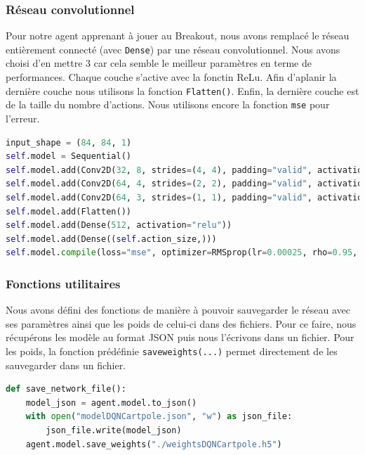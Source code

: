 \documentclass[10pt,a4paper]{article}
\begin{document}
\subsubsection{Réseau convolutionnel}

Pour notre agent apprenant à jouer au Breakout, nous avons remplacé le réseau entièrement connecté (avec \lstinline{Dense}) par une réseau convolutionnel. Nous avons choisi d'en mettre 3 car cela semble le meilleur paramètres en terme de performances. Chaque couche s'active avec la fonctin ReLu. Afin d'aplanir la dernière couche nous utilisons la fonction \lstinline{Flatten()}. Enfin, la dernière couche est de la taille du nombre d'actions. Nous utilisons encore la fonction \lstinline{mse} pour l'erreur.

\begin{lstlisting}[language=Python, caption=Réseau convolutionnel de l'agent Breakout]
input_shape = (84, 84, 1)
self.model = Sequential()
self.model.add(Conv2D(32, 8, strides=(4, 4), padding="valid", activation="relu", input_shape=input_shape, data_format="channels_first"))
self.model.add(Conv2D(64, 4, strides=(2, 2), padding="valid", activation="relu", input_shape=input_shape, data_format="channels_first"))
self.model.add(Conv2D(64, 3, strides=(1, 1), padding="valid", activation="relu", input_shape=input_shape, data_format="channels_first"))
self.model.add(Flatten())
self.model.add(Dense(512, activation="relu"))
self.model.add(Dense((self.action_size,)))
self.model.compile(loss="mse", optimizer=RMSprop(lr=0.00025, rho=0.95, epsilon=0.01), metrics=["accuracy"])
\end{lstlisting}

\subsubsection{Fonctions utilitaires}

Nous avons défini des fonctions de manière à pouvoir sauvegarder le réseau avec ses paramètres ainsi que les poids de celui-ci dans des fichiers. Pour ce faire, nous récupérons les modèle au format JSON puis nous l'écrivons dans un fichier. Pour les poids, la fonction prédéfinie \lstinline{saveweights(...)} permet directement de les sauvegarder dans un fichier.
\begin{lstlisting}[language=Python, caption=Sauvegarde du réseau neuronal et de ses poids]
def save_network_file():
    model_json = agent.model.to_json()
    with open("modelDQNCartpole.json", "w") as json_file:
        json_file.write(model_json)
    agent.model.save_weights("./weightsDQNCartpole.h5")
\end{lstlisting}
\end{document}
